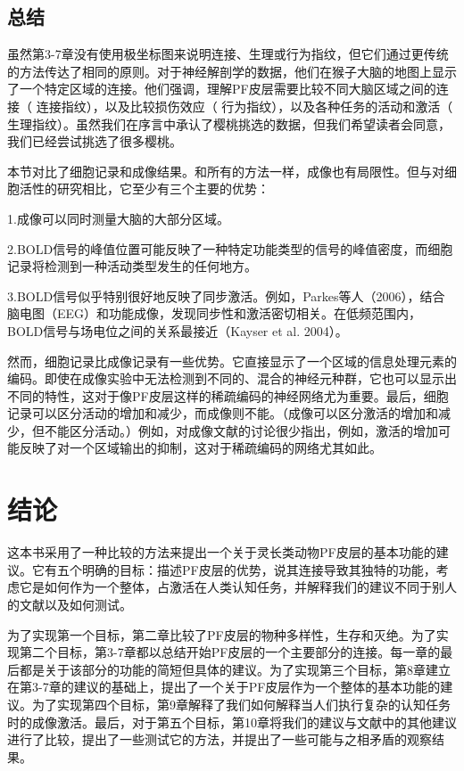 \subsection{总结}
虽然第3-7章没有使用极坐标图来说明连接、生理或行为指纹，但它们通过更传统的方法传达了相同的原则。对于神经解剖学的数据，他们在猴子大脑的地图上显示了一个特定区域的连接。他们强调，理解PF皮层需要比较不同大脑区域之间的连接（ 连接指纹），以及比较损伤效应（ 行为指纹），以及各种任务的活动和激活（ 生理指纹）。虽然我们在序言中承认了樱桃挑选的数据，但我们希望读者会同意，我们已经尝试挑选了很多樱桃。
\par
本节对比了细胞记录和成像结果。和所有的方法一样，成像也有局限性。但与对细胞活性的研究相比，它至少有三个主要的优势：
\par 1.成像可以同时测量大脑的大部分区域。
\par 2.BOLD信号的峰值位置可能反映了一种特定功能类型的信号的峰值密度，而细胞记录将检测到一种活动类型发生的任何地方。
\par 3.BOLD信号似乎特别很好地反映了同步激活。例如，Parkes等人（2006），结合脑电图（EEG）和功能成像，发现同步性和激活密切相关。在低频范围内，BOLD信号与场电位之间的关系最接近（Kayser et al. 2004）。
\par 然而，细胞记录比成像记录有一些优势。它直接显示了一个区域的信息处理元素的编码。即使在成像实验中无法检测到不同的、混合的神经元种群，它也可以显示出不同的特性，这对于像PF皮层这样的稀疏编码的神经网络尤为重要。最后，细胞记录可以区分活动的增加和减少，而成像则不能。（成像可以区分激活的增加和减少，但不能区分活动。）例如，对成像文献的讨论很少指出，例如，激活的增加可能反映了对一个区域输出的抑制，这对于稀疏编码的网络尤其如此。

\section{结论}
这本书采用了一种比较的方法来提出一个关于灵长类动物PF皮层的基本功能的建议。它有五个明确的目标：描述PF皮层的优势，说其连接导致其独特的功能，考虑它是如何作为一个整体，占激活在人类认知任务，并解释我们的建议不同于别人的文献以及如何测试。
\par
为了实现第一个目标，第二章比较了PF皮层的物种多样性，生存和灭绝。为了实现第二个目标，第3-7章都以总结开始PF皮层的一个主要部分的连接。每一章的最后都是关于该部分的功能的简短但具体的建议。为了实现第三个目标，第8章建立在第3-7章的建议的基础上，提出了一个关于PF皮层作为一个整体的基本功能的建议。为了实现第四个目标，第9章解释了我们如何解释当人们执行复杂的认知任务时的成像激活。最后，对于第五个目标，第10章将我们的建议与文献中的其他建议进行了比较，提出了一些测试它的方法，并提出了一些可能与之相矛盾的观察结果。


